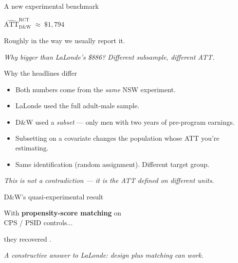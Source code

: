 \documentclass[11pt,aspectratio=169]{beamer}
\begin{document}
\begin{frame}{A new experimental benchmark}
\vspace{1.6em}
\begin{center}
\Large
$\widehat{\text{ATT}}^{\text{RCT}}_{\text{D\&W}} \;\approx\; \$1{,}794$
\end{center}
\vspace{0.6em}
\begin{center}
\large
Roughly \; \;in the way we usually report it.
\end{center}
\vspace{1em}
\begin{center}
\small\color{warmgray}\itshape
Why bigger than LaLonde's \$886? \;\textit{Different subsample, different ATT.}
\end{center}
\end{frame}

\begin{frame}{Why the headlines differ}
\vspace{0.5em}
\begin{itemize}
  \item Both numbers come from the \textit{same} NSW experiment.
  \item LaLonde used the full adult-male sample.
  \item D\&W used a \textit{subset} --- only men with two years of pre-program earnings.
  \item Subsetting on a covariate changes the population whose ATT you're estimating.
  \item Same identification (random assignment). \;Different target group.
\end{itemize}
\vspace{0.5em}
\begin{center}
\small\color{warmgray}\itshape
This is not a contradiction --- it is the ATT defined on different units.
\end{center}
\end{frame}

\begin{frame}{D\&W's quasi-experimental result}
\vspace{1em}
\begin{center}
\large
With \textbf{propensity-score matching} on \\[0.2em] CPS / PSID controls...
\end{center}
\vspace{0.6em}
\begin{center}
\Large
they recovered \;.
\end{center}
\vspace{0.8em}
\begin{center}
\small\color{warmgray}\itshape
A constructive answer to LaLonde: \;design plus matching \textit{can} work.
\end{center}
\end{frame}
\end{document}
